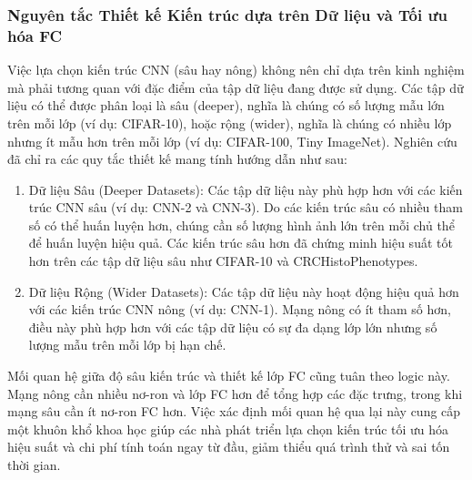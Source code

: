 \subsubsection{Nguyên tắc Thiết kế Kiến trúc dựa trên Dữ liệu và Tối ưu hóa FC}

Việc lựa chọn kiến trúc CNN (sâu hay nông) không nên chỉ dựa trên kinh nghiệm mà phải 
tương quan với đặc điểm của tập dữ liệu đang được sử dụng. Các tập dữ liệu có thể được 
phân loại là sâu (deeper), nghĩa là chúng có số lượng mẫu lớn trên mỗi lớp (ví dụ: CIFAR-10), 
hoặc rộng (wider), nghĩa là chúng có nhiều lớp nhưng ít mẫu hơn trên mỗi 
lớp (ví dụ: CIFAR-100, Tiny ImageNet).\cite{Basha2020}
Nghiên cứu đã chỉ ra các quy tắc thiết kế mang tính hướng dẫn như sau:

\begin{enumerate}
    \item Dữ liệu Sâu (Deeper Datasets): Các tập dữ liệu này phù hợp hơn với các kiến trúc 
    CNN sâu (ví dụ: CNN-2 và CNN-3). Do các kiến trúc sâu có nhiều tham số có thể huấn luyện 
    hơn, chúng cần số lượng hình ảnh lớn trên mỗi chủ thể để huấn luyện hiệu quả. Các kiến 
    trúc sâu hơn đã chứng minh hiệu suất tốt hơn trên các tập dữ liệu sâu như CIFAR-10 và 
    CRCHistoPhenotypes.\cite{Basha2020}
    \item Dữ liệu Rộng (Wider Datasets): Các tập dữ liệu này hoạt động hiệu quả hơn với các 
    kiến trúc CNN nông (ví dụ: CNN-1). Mạng nông có ít tham số hơn, điều này phù hợp hơn với 
    các tập dữ liệu có sự đa dạng lớp lớn nhưng số lượng mẫu trên mỗi lớp bị hạn chế.\cite{Basha2020}
\end{enumerate}

Mối quan hệ giữa độ sâu kiến trúc và thiết kế lớp FC cũng tuân theo logic này. 
Mạng nông cần nhiều nơ-ron và lớp FC hơn để tổng hợp các đặc trưng, trong khi mạng sâu 
cần ít nơ-ron FC hơn. Việc xác định mối quan hệ qua lại này cung cấp một khuôn khổ khoa 
học giúp các nhà phát triển lựa chọn kiến trúc tối ưu hóa hiệu suất và chi phí tính toán 
ngay từ đầu, giảm thiểu quá trình thử và sai tốn thời gian.

